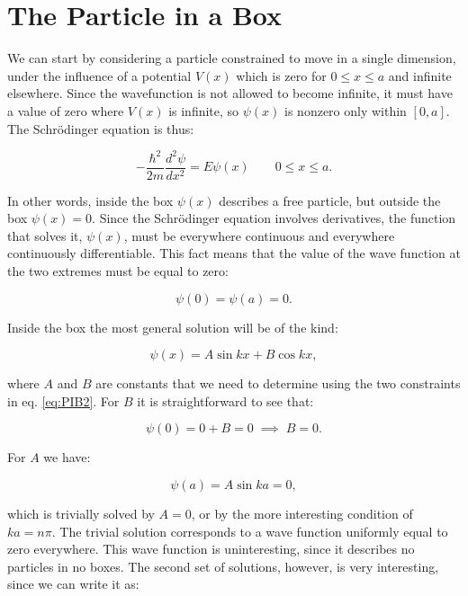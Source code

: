 \documentclass[
  9pt,
]{extbook}
\theoremstyle{definition}
\theoremstyle{definition}
\theoremstyle{definition}
\theoremstyle{remark}
\begin{document}
\hypertarget{the-particle-in-a-box}{%
\section{The Particle in a Box}\label{the-particle-in-a-box}}

We can start by considering a particle constrained to move in a single dimension, under the influence of a potential \(V(x)\) which is zero for \(0 \leq x \leq a\) and infinite elsewhere. Since the wavefunction is not allowed to become infinite, it must have a value of zero where \(V(x)\) is infinite, so \(\psi(x)\) is nonzero only within \([0,a]\). The Schrödinger equation is thus:

\begin{equation}
- \frac{\hbar^2}{2m} \frac{d^2\psi}{dx^2} = E \psi(x)
\qquad 0 \leq x \leq a.
\label{eq:PIB1}
\end{equation}

In other words, inside the box \(\psi(x)\) describes a free particle, but outside the box \(\psi(x)=0\). Since the Schrödinger equation involves derivatives, the function that solves it, \(\psi(x)\), must be everywhere continuous and everywhere continuously differentiable. This fact means that the value of the wave function at the two extremes must be equal to zero:

\begin{equation}
\psi(0)=\psi(a)=0.
\label{eq:PIB2}
\end{equation}

Inside the box the most general solution will be of the kind:

\begin{equation}
\psi(x)=A \sin kx + B \cos kx,
\label{eq:PIB3}
\end{equation}

where \(A\) and \(B\) are constants that we need to determine using the two constraints in eq. \eqref{eq:PIB2}. For \(B\) it is straightforward to see that:

\begin{equation}
\psi(0)= 0 + B =0 \; \implies \; B=0.
\label{eq:PIB4}
\end{equation}

For \(A\) we have:

\begin{equation}
\psi(a)= A\sin ka = 0,
\label{eq:PIB5}
\end{equation}

which is trivially solved by \(A=0\), or by the more interesting condition of \(ka=n\pi\). The trivial solution corresponds to a wave function uniformly equal to zero everywhere. This wave function is uninteresting, since it describes no particles in no boxes. The second set of solutions, however, is very interesting, since we can write it as:
\end{document}
